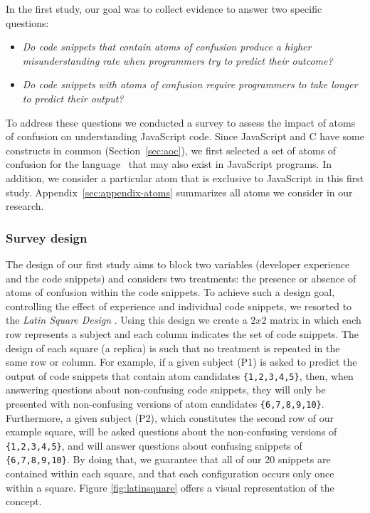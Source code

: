 In the first study, our goal was to collect evidence to answer two specific questions: 
\begin{itemize}
    \item \emph{Do code snippets that contain atoms of confusion produce a higher misunderstanding rate when programmers try to predict their outcome?}
    \item \emph{Do code snippets with atoms of confusion require programmers to take longer to predict their output?}
\end{itemize}

To address these questions we conducted a survey to assess the impact of atoms of confusion on understanding JavaScript code. Since JavaScript and C have some constructs in common (Section~\ref{sec:aoc}), we first selected a set of atoms of confusion for the \clang language~\cite{DBLP:conf/sigsoft/GopsteinIYDZYC17} that may also exist in JavaScript programs. {\color{red}In addition, we consider a particular atom that is exclusive to JavaScript in this first study}. Appendix~\ref{sec:appendix-atoms} summarizes all atoms we consider in our research. 

\subsubsection{Survey design} 

The design of our first study aims to block two variables (developer experience and the code snippets) and considers two treatments: the presence or absence of 
atoms of confusion within the code snippets. 
To achieve such a design goal, controlling the effect of experience and individual code snippets, we resorted to the \textit{Latin Square Design} \cite{Hunter-Experimenters}. Using this design we create a $2 x 2$ matrix in which each row represents a subject and each column indicates the set of code snippets. The design of each square (a replica) is such that no treatment is repeated in the same row or column. For example, if a given subject (P1) is asked to predict the output of code snippets that contain atom candidates \texttt{\{1,2,3,4,5\}}, then, when answering questions about non-confusing code snippets, they will only be presented with non-confusing versions of atom candidates \texttt{\{6,7,8,9,10\}}. Furthermore, a given subject (P2), which constitutes the second row of our example square, will be asked questions about the non-confusing versions of \texttt{\{1,2,3,4,5\}}, and will answer questions about confusing snippets of \texttt{\{6,7,8,9,10\}}. By doing that, we guarantee that all of our 20 snippets are contained within each square, and that each configuration occurs only once within a square. Figure \ref{fig:latinsquare} offers a visual representation of the concept.

